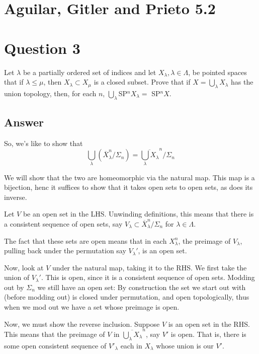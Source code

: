\documentclass[11pt]{article}
\begin{document}
\section*{Aguilar, Gitler and Prieto 5.2}
\section{Question 3}
Let $\lambda$ be a partially ordered set of indices and let $X_\lambda, \lambda \in \Lambda $, be pointed spaces that if $\lambda \leq \mu$, then $X_ \lambda \subset X_\mu$ is  a closed subset. Prove that if $X = \bigcup_\lambda X_\lambda$ has the union topology, then, for each $n$, $\bigcup_\lambda$SP$^n X_ \lambda = $ SP$^n X$.
\subsection{Answer}



So, we's like to show that
\[ \bigcup_\lambda \left( \overline{X}_\lambda^n / \Sigma_n \right) = \overline{\bigcup_\lambda X_\lambda}^n / \Sigma_n\]



We will show that the two are homeomorphic via the natural map. This map is a bijection, henc it suffices to show that it takes open sets to open sets, as does its inverse.


Let $V$ be an open set in the LHS. Unwinding definitions, this means that there is a consistent sequence of open sets, say $V_\lambda \subset \overline{X}_\lambda^n / \Sigma_n  $ for  $\lambda \in \Lambda$. 



The fact that these sets are open means that in each $X_\lambda^n$, the preimage of $V_\lambda$, pulling back under the permutation say $V_\lambda'$, is an open set.

Now, look at $V$ under the natural map, taking it to the RHS. We first take the union of $V_\lambda'$. This is open, since it is a consistent sequence of open sets. Modding out by $\Sigma_n$ we still have an open set: By construction the set we start out with (before modding out) is closed under permutation, and open topologically, thus when we mod out we have a set whose preimage is open.

Now, we must show the reverse inclusion. Suppose $V$ is an open set in the RHS. This means that the preimage of $V$ in $ \overline{\bigcup_\lambda X_\lambda}^n $, say $V'$ is open. That is, there is some open consistent sequence of $V'_\lambda$ each in $X_\lambda$ whose union is our $V'$.
\end{document}
